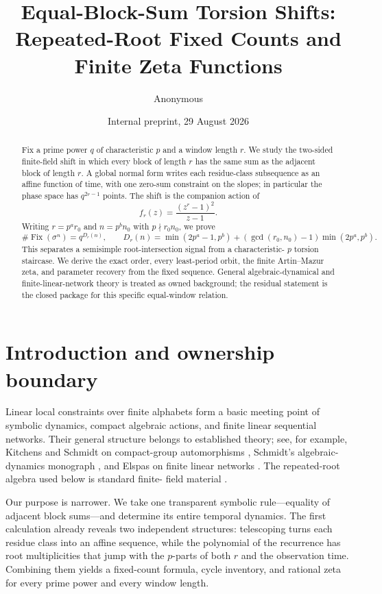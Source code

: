 \documentclass[11pt,a4paper]{amsart}
\title[Equal-block-sum torsion shifts]{Equal-Block-Sum Torsion Shifts:\\
Repeated-Root Fixed Counts and Finite Zeta Functions}
\author{Anonymous}
\date{Internal preprint, 29 August 2026}
\theoremstyle{definition}
\theoremstyle{remark}
\newcommand{\Fix}{\operatorname{Fix}}
\begin{document}
\begin{abstract}
Fix a prime power $q$ of characteristic $p$ and a window length $r$.  We
study the two-sided finite-field shift in which every block of length $r$ has
the same sum as the adjacent block of length $r$.  A global normal form
writes each residue-class subsequence as an affine function of time, with one
zero-sum constraint on the slopes; in particular the phase space has
$q^{2r-1}$ points.  The shift is the companion action of
\[
 f_r(z)=\frac{(z^r-1)^2}{z-1}.
\]
Writing $r=p^a r_0$ and $n=p^b n_0$ with $p\nmid r_0n_0$, we prove
\[
 \#\Fix(\sigma^n)=q^{D_r(n)},\qquad
 D_r(n)=\min(2p^a-1,p^b)
 +(\gcd(r_0,n_0)-1)\min(2p^a,p^b).
\]
This separates a semisimple root-intersection signal from a characteristic-
$p$ torsion staircase.  We derive the exact order, every least-period orbit,
the finite Artin--Mazur zeta, and parameter recovery from the fixed sequence.
General algebraic-dynamical and finite-linear-network theory is treated as
owned background; the residual statement is the closed package for this
specific equal-window relation.
\end{abstract}

\maketitle

\section{Introduction and ownership boundary}

Linear local constraints over finite alphabets form a basic meeting point of
symbolic dynamics, compact algebraic actions, and finite linear sequential
networks.  Their general structure belongs to established theory; see, for
example, Kitchens and Schmidt on compact-group automorphisms
\cite{KitchensSchmidt1989}, Schmidt's algebraic-dynamics monograph
\cite{Schmidt1995}, and Elspas on finite linear networks
\cite{Elspas1959}.  The repeated-root algebra used below is standard finite-
field material \cite{LidlNiederreiter1996}.

Our purpose is narrower.  We take one transparent symbolic rule---equality
of adjacent block sums---and determine its entire temporal dynamics.  The
first calculation already reveals two independent structures: telescoping
turns each residue class into an affine sequence, while the polynomial of
the recurrence has root multiplicities that jump with the $p$-parts of both
$r$ and the observation time.  Combining them yields a fixed-count formula,
cycle inventory, and rational zeta for every prime power and every window
length.
\end{document}
